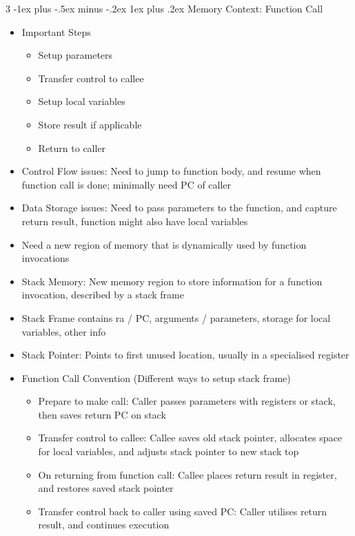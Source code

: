 \documentclass[10pt, landscape]{article}
\makeatletter
\renewcommand{\subsection}{\@startsection{subsection}{3}{0mm}%
                                {-1ex plus -.5ex minus -.2ex}%
                                {1ex plus .2ex}%
                                {\normalfont\small\bfseries}}%
\makeatother
\begin{document}
\begin{multicols*}{3}
\subsection{Memory Context: Function Call}
\begin{itemize}
    \item Important Steps
    \begin{itemize}
        \item Setup parameters
        \item Transfer control to callee
        \item Setup local variables
        \item Store result if applicable
        \item Return to caller
    \end{itemize}
    \item Control Flow issues: Need to jump to function body, and resume when function call is done; minimally need PC of caller
    \item Data Storage issues: Need to pass parameters to the function, and capture return result, function might also have local variables
    \item Need a new region of memory that is dynamically used by function invocations
    \item Stack Memory: New memory region to store information for a function invocation, described by a stack frame
    \item Stack Frame contains ra / PC, arguments / parameters, storage for local variables, other info
    \item Stack Pointer: Points to first unused location, usually in a specialised register
    \item Function Call Convention (Different ways to setup stack frame)
    \begin{itemize}
        \item Prepare to make call: Caller passes parameters with registers or stack, then saves return PC on stack
        \item Transfer control to callee: Callee saves old stack pointer, allocates space for local variables, and adjusts stack pointer to new stack top
        \item On returning from function call: Callee places return result in register, and restores saved stack pointer
        \item Transfer control back to caller using saved PC: Caller utilises return result, and continues execution
    \end{itemize}

\end{itemize}
\end{multicols*}
\end{document}
